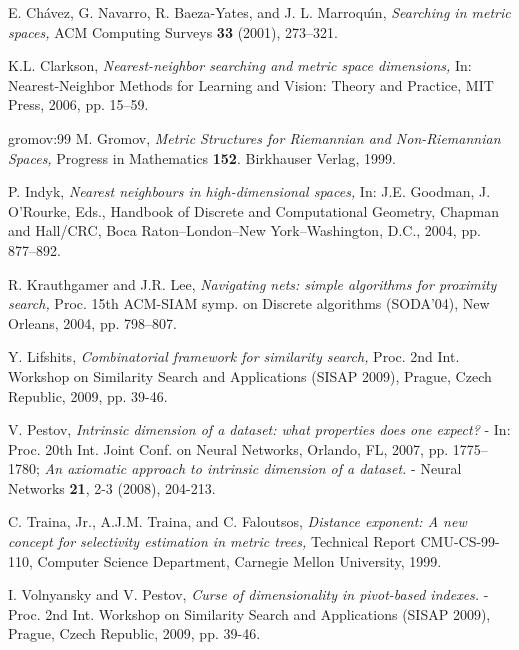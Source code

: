\documentclass[12pt]{article}
\begin{document}
\begin{thebibliography}{1}

E. Ch\'avez, G. Navarro, R. Baeza-Yates, and J. L. Marroqu\'\i n,
{\em Searching in metric spaces,} ACM Computing Surveys \textbf{33} (2001), 273--321.

K.L. Clarkson, {\em Nearest-neighbor searching and metric space dimensions,}
In: Nearest-Neighbor Methods for Learning and Vision: Theory and Practice, MIT Press, 2006, pp. 15--59.

\bibitem 
{gromov:99} 
M. Gromov, {\em Metric Structures for Riemannian and
Non-Riemannian Spaces,} Progress in Mathematics \textbf{152}. Birkhauser
Verlag, 1999.

P. Indyk, {\em Nearest neighbours in high-dimensional spaces,}
In: J.E. Goodman, J. O'Rourke, Eds.,
Handbook of Discrete and Computational Geometry, Chapman and Hall/CRC, Boca Raton--London--New York--Washington, D.C.,
2004, pp. 877--892.

 R. Krauthgamer and J.R. Lee, {\em Navigating nets: simple algorithms for proximity search,} Proc. 15th ACM-SIAM symp. on Discrete algorithms (SODA'04), New Orleans, 2004, pp. 798--807.

Y. Lifshits, {\em Combinatorial framework for similarity search,} Proc. 2nd Int. Workshop on Similarity Search and Applications (SISAP 2009), Prague, Czech Republic, 2009, pp. 39-46. 

 V. Pestov, {\em Intrinsic dimension of a dataset: what properties does one expect?} - In: Proc. 20th Int. Joint Conf. on Neural Networks, Orlando, FL, 2007, pp. 1775--1780; {\em An axiomatic approach to intrinsic dimension of a dataset.} - Neural Networks \textbf{21}, 2-3 (2008), 204-213.

C. Traina, Jr., A.J.M. Traina, and C. Faloutsos,
{\em Distance exponent: A new concept for selectivity estimation in metric
trees,} 
Technical Report CMU-CS-99-110, Computer Science Department, 
Carnegie Mellon University, 1999.

 I. Volnyansky and V. Pestov, {\em Curse of dimensionality in pivot-based indexes.} - Proc. 2nd Int. Workshop on Similarity Search and Applications (SISAP 2009), Prague, Czech Republic, 2009,
pp. 39-46. 

\end{thebibliography}
\end{document}
